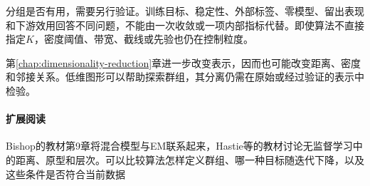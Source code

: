分组是否有用，需要另行验证。训练目标、稳定性、外部标签、零模型、留出表现和下游效用回答不同问题，不能由一次收敛或一项内部指标代替。即使算法不直接指定$K$，密度阈值、带宽、截线或先验也仍在控制粒度。

第\ref{chap:dimensionality-reduction}章进一步改变表示，因而也可能改变距离、密度和邻接关系。低维图形可以帮助探索群组，其分离仍需在原始或经过验证的表示中检验。

\paragraph{扩展阅读}
Bishop的教材第9章将混合模型与EM联系起来，Hastie等的教材讨论无监督学习中的距离、原型和层次。可以比较算法怎样定义群组、哪一种目标随迭代下降，以及这些条件是否符合当前数据
